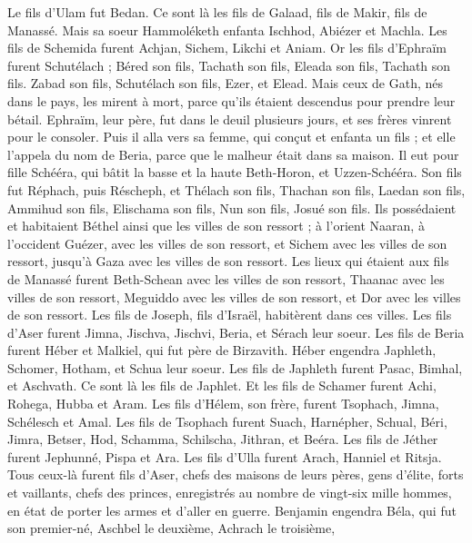 \begin{multicols}{2}
Le fils d'Ulam fut Bedan. Ce sont là les fils de Galaad, fils de Makir, fils de Manassé.
Mais sa soeur Hammoléketh enfanta Ischhod, Abiézer et Machla.
Les fils de Schemida furent Achjan, Sichem, Likchi et Aniam.
Or les fils d'Ephraïm furent  Schutélach ; Béred son fils, Tachath son fils, Eleada son fils, Tachath son fils.
Zabad son fils, Schutélach son fils, Ezer, et Elead. Mais ceux de Gath, nés dans le pays, les mirent à mort, parce qu'ils étaient descendus pour prendre leur bétail.
Ephraïm, leur père, fut dans le deuil plusieurs jours, et ses frères vinrent pour le consoler.
Puis il alla vers sa femme, qui conçut et enfanta un fils ; et elle l'appela du nom de Beria, parce que le malheur était dans sa maison.
Il eut pour fille Schééra, qui bâtit la basse et la haute Beth-Horon, et Uzzen-Schééra.
Son fils fut  Réphach, puis Réscheph, et Thélach son fils, Thachan son fils,
Laedan son fils, Ammihud son fils, Elischama son fils,
Nun son fils, Josué son fils.
Ils possédaient et habitaient Béthel ainsi que les villes de son ressort ; à l’orient Naaran, à l’occident Guézer, avec les villes de son ressort, et Sichem avec les villes de son ressort, jusqu'à Gaza avec les villes de son ressort.
Les lieux qui étaient aux fils de Manassé furent  Beth-Schean avec les villes de son ressort, Thaanac avec les villes de son ressort, Meguiddo avec les villes de son ressort, et Dor avec les villes de son ressort. Les fils de Joseph, fils d'Israël, habitèrent dans ces villes.
Les fils d’Aser furent Jimna, Jischva, Jischvi, Beria, et Sérach leur soeur.
Les fils de Beria furent Héber et Malkiel, qui fut père de Birzavith.
Héber engendra Japhleth, Schomer, Hotham, et Schua leur soeur.
Les fils de Japhleth furent Pasac, Bimhal, et Aschvath. Ce sont là les fils de Japhlet.
Et les fils de Schamer furent Achi, Rohega, Hubba et Aram.
Les fils d'Hélem, son frère, furent  Tsophach, Jimna, Schélesch et Amal.
Les fils de Tsophach furent Suach, Harnépher, Schual, Béri, Jimra,
Betser, Hod, Schamma, Schilscha, Jithran, et Beéra.
Les fils de Jéther furent Jephunné, Pispa et Ara.
Les fils d'Ulla furent Arach, Hanniel et Ritsja.
Tous ceux-là furent fils d'Aser, chefs des maisons de leurs pères, gens d'élite, forts et vaillants, chefs des princes, enregistrés au nombre de vingt-six mille hommes, en état de porter les armes et d’aller en guerre.
\VerseOne{}Benjamin engendra Béla, qui fut son premier-né, Aschbel le deuxième, Achrach le troisième,

\end{multicols}
